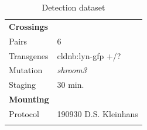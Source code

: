 \documentclass[11pt,singlespacinge,twoside]{reedthesis} %
\begin{document}
\begin{longtable}[]{@{}ll@{}}
\caption{\label{tab:detectdata} Detection dataset}\tabularnewline
\toprule
\endhead
\begin{minipage}[t]{0.21\columnwidth}\raggedright
\textbf{Crossings}\strut
\end{minipage} & \begin{minipage}[t]{0.73\columnwidth}\raggedright
\strut
\end{minipage}\tabularnewline
\begin{minipage}[t]{0.21\columnwidth}\raggedright
Pairs\strut
\end{minipage} & \begin{minipage}[t]{0.73\columnwidth}\raggedright
6\strut
\end{minipage}\tabularnewline
\begin{minipage}[t]{0.21\columnwidth}\raggedright
Transgenes\strut
\end{minipage} & \begin{minipage}[t]{0.73\columnwidth}\raggedright
cldnb:lyn-gfp +/?\strut
\end{minipage}\tabularnewline
\begin{minipage}[t]{0.21\columnwidth}\raggedright
Mutation\strut
\end{minipage} & \begin{minipage}[t]{0.73\columnwidth}\raggedright
\emph{shroom3}\strut
\end{minipage}\tabularnewline
\begin{minipage}[t]{0.21\columnwidth}\raggedright
Staging\strut
\end{minipage} & \begin{minipage}[t]{0.73\columnwidth}\raggedright
30 min.\strut
\end{minipage}\tabularnewline
\begin{minipage}[t]{0.21\columnwidth}\raggedright
\textbf{Mounting}\strut
\end{minipage} & \begin{minipage}[t]{0.73\columnwidth}\raggedright
\strut
\end{minipage}\tabularnewline
\begin{minipage}[t]{0.21\columnwidth}\raggedright
Protocol\strut
\end{minipage} & \begin{minipage}[t]{0.73\columnwidth}\raggedright
190930 D.S. Kleinhans\strut
\end{minipage}\tabularnewline
\begin{minipage}[t]{0.21\columnwidth}\raggedright

\end{minipage}
\end{longtable}
\end{document}

